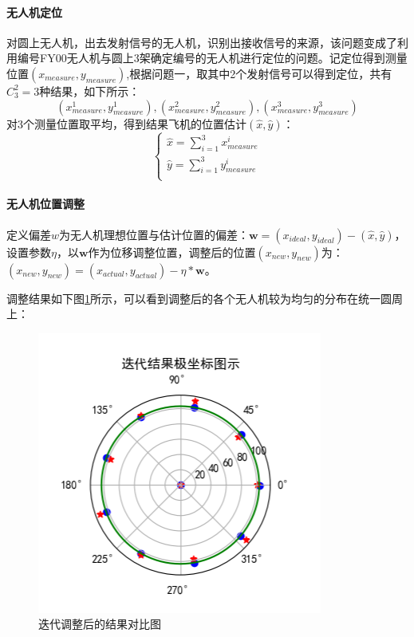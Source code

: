 \documentclass[withoutpreface,bwprint]{cumcmthesis} %
\begin{document}
			\paragraph{无人机定位}
			对圆上无人机，出去发射信号的无人机，识别出接收信号的来源，该问题变成了利用编号FY00无人机与圆上3架确定编号的无人机进行定位的问题。记定位得到测量位置$(x_{measure},y_{measure})$,根据问题一，取其中2个发射信号可以得到定位，共有$C^2_3=3$种结果，如下所示：
			$$(x_{measure}^1,y_{measure}^1),(x_{measure}^2,y_{measure}^2),(x_{measure}^3,y_{measure}^3)$$
			对3个测量位置取平均，得到结果飞机的位置估计$(\hat{x},\hat{y})$：
			$$
			\left\{ \begin{array}{l}  \hat{x}=\sum_{i=1}^3{x_{measure}^{i}}\\  \hat{y}=\sum_{i=1}^3{y_{measure}^{i}}\\ \end{array} \right.  
			$$
			
			\paragraph{无人机位置调整}
			定义偏差$w$为无人机理想位置与估计位置的偏差：$\boldsymbol{w}=(x_{ideal},y_{ideal}) - (\hat{x},\hat{y})$，设置参数$\eta{}$，以$\boldsymbol{w}$作为位移调整位置，调整后的位置$(x_{new},y_{new})$为：$(x_{new},y_{new})= (x_{actual},y_{actual}) - \eta{} * \boldsymbol{w}$。
			\par 调整结果如下图\ref{Polar}所示，可以看到调整后的各个无人机较为均匀的分布在统一圆周上：
			\begin{figure}[htb]
				\centering
				\includegraphics[width=0.7\linewidth]{./figures/Polar Axis}
				\caption{迭代调整后的结果对比图}
				\label{Polar}
			\end{figure}
\end{document}
